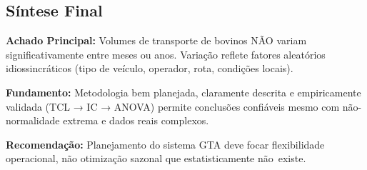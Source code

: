 \documentclass[12pt,a4paper]{article}
\begin{document}
\subsection*{Síntese Final}

\noindent \textbf{Achado Principal:} Volumes de transporte de bovinos NÃO variam significativamente entre meses ou anos. Variação reflete fatores aleatórios idiossincráticos (tipo de veículo, operador, rota, condições locais).

\noindent \textbf{Fundamento:} Metodologia bem planejada, claramente descrita e empiricamente validada (TCL → IC → ANOVA) permite conclusões confiáveis mesmo com não-normalidade extrema e dados reais complexos.

\noindent \textbf{Recomendação:} Planejamento do sistema GTA deve focar flexibilidade operacional, não otimização sazonal que estatisticamente não~existe.

\newpage




\end{document}
